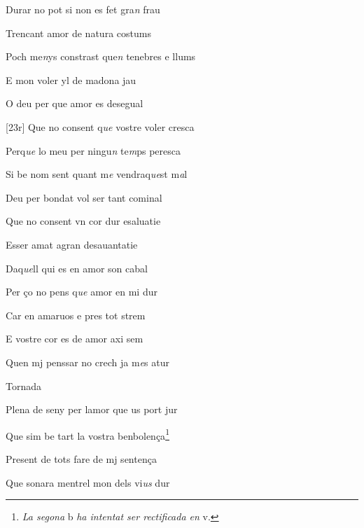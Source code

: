 \documentclass[12pt]{article}
\begin{document}
\begin{estrofa}

 Durar no pot si non es fet gra\textit{n} frau

 Trencant amor de natura costums

 Poch me\textit{n}ys constrast que\textit{n} tenebres e llums

 E mon voler yl de madona jau

 O deu per que amor es desegual

 [23r] Que no consent q\textit{ue }vostre voler cresca

 Perq\textit{ue} lo meu per ningu\textit{n} te\textit{m}ps peresca

 Si be nom sent quant m\textit{e }vendraq\textit{ue}st m\textit{a}l

\end{estrofa}



\begin{estrofa}

 Deu per bondat vol ser tant cominal

 Que no consent vn cor dur esaluatie

 Esser amat agran desauantatie

 Daq\textit{ue}ll qui es en amor son cabal

 Per \c{c}o no pens q\textit{ue} amor en mi dur

 Car en amaruos e pres tot strem

 E vostre cor es de amor axi sem

 Quen mj penssar no crech ja m\textit{e}s atur

\end{estrofa}


\begin{estrofaExtra}%




\begin{tornada}

Tornada

\end{tornada}


\end{estrofaExtra}


\begin{estrofa}

 Plena de seny per lamor que us port jur

 Que sim be tart la vostra benbolen\c{c}a\footnote{\textit{La segona }b\textit{
ha intentat ser rectificada en} v.}

 Present de tots fare de mj senten\c{c}a

 Que sonara mentrel mon dels vi\textit{us} dur

\end{estrofa}
\end{document}
